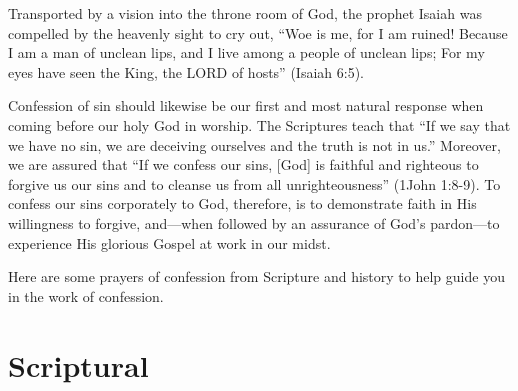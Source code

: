 \documentclass[]{book}
\begin{document}
Transported by a vision into the throne room of God, the prophet Isaiah
was compelled by the heavenly sight to cry out, ``Woe is me, for I am
ruined! Because I am a man of unclean lips, and I live among a people of
unclean lips; For my eyes have seen the King, the LORD of hosts''
(Isaiah 6:5).

Confession of sin should likewise be our first and most natural response
when coming before our holy God in worship. The Scriptures teach that
``If we say that we have no sin, we are deceiving ourselves and the
truth is not in us.'' Moreover, we are assured that ``If we confess our
sins, {[}God{]} is faithful and righteous to forgive us our sins and to
cleanse us from all unrighteousness'' (1John 1:8-9). To confess our sins
corporately to God, therefore, is to demonstrate faith in His
willingness to forgive, and---when followed by an assurance of God's
pardon---to experience His glorious Gospel at work in our midst.

Here are some prayers of confession from Scripture and history to help
guide you in the work of confession.

\section{Scriptural}\label{scriptural}
\end{document}
